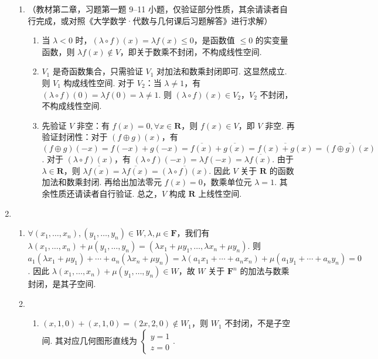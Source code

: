 \begin{enumerate}
\begin{enumerate}
              \item （教材第二章，习题第一题 9--11 小题，仅验证部分性质，其余请读者自行完成，或对照《大学数学·代数与几何课后习题解答》进行求解）
                    \begin{enumerate}[start=9,label={(\arabic*)}]
                        \item 当 $\lambda<0$ 时，$(\lambda\circ f)(x)=\lambda f(x)\leqslant 0$，是函数值 $\le0$ 的实变量函数，则 $\lambda f(x)\not\in V$，即关于数乘不封闭，不构成线性空间.

                        \item $V_1$ 是奇函数集合，只需验证 $V_1$ 对加法和数乘封闭即可. 这显然成立. 则 $V_1$ 构成线性空间. 对于 $V_2$：当 $\lambda\neq 1$，有 $(\lambda\circ f)(0)=\lambda f(0)=\lambda\neq 1$. 则 $(\lambda\circ f)(x)\in V_2$，$V_2$ 不封闭，不构成线性空间.

                        \item 先验证 $V$ 非空：有 $f(x)=0,\forall x\in \mathbf{R}$，则 $f(x)\in V$，即 $V$ 非空. 再验证封闭性：对于 $(f\oplus g)(x)$，有 $(f\oplus g)(-x)=f(-x)+g(-x)=\overline{f(x)}+\overline{g(x)}=\overline{f(x)+g(x)}=\overline{(f\oplus g)(x)}$. 对于 $(\lambda\circ f)(x)$，有 $(\lambda\circ f)(-x)=\lambda f(-x)=\lambda\overline{f(x)}$. 由于 $\lambda \in \mathbf{R}$，则 $\lambda \overline{f(x)}=\overline{\lambda f(x)}=\overline{(\lambda\circ f)(x)}$. 因此 $V$ 关于 $\mathbf{R}$ 的函数加法和数乘封闭. 再给出加法零元 $f(x)=0$，数乘单位元 $\lambda=1$. 其余性质还请读者自行验证. 总之，$V$ 构成 $\mathbf{R}$ 上线性空间.
                    \end{enumerate}
          \end{enumerate}

    \item \begin{enumerate}
              \item $\forall (x_1,\ldots,x_n),(y_1,\ldots,y_n)\in W,\lambda,\mu\in \mathbf{F}$，我们有$\lambda(x_1,\ldots,x_n)+\mu(y_1,\ldots,y_n)=(\lambda x_1+\mu y_1,\ldots,\lambda x_n+\mu y_n)$. 则 $a_1(\lambda x_1+\mu y_1)+\cdots+a_n(\lambda x_n+\mu y_n)=\lambda(a_1x_1+\cdots+a_nx_n)+\mu(a_1y_1+\cdots+a_ny_n)=0$. 因此 $\lambda(x_1,\ldots,x_n)+\mu(y_1,\ldots,y_n)\in W$，故 $W$ 关于 $\mathbf{F}^n$ 的加法与数乘封闭，是其子空间.

              \item \begin{enumerate}
                        \item $(x,1,0)+(x,1,0)=(2x,2,0)\not\in W_1$，则 $W_1$ 不封闭，不是子空间. 其对应几何图形直线为 $\begin{cases}
                                      y=1 \\
                                      z=0
                                  \end{cases}$.


\end{enumerate}
\end{enumerate}
\end{enumerate}
